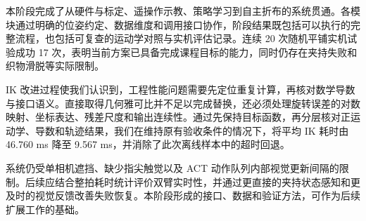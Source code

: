 \documentclass[UTF8,a4paper,zihao=-4]{ctexart}
\begin{document}
本阶段完成了从硬件与标定、遥操作示教、策略学习到自主折布的系统贯通。各模块通过明确的位姿约定、数据维度和调用接口协作，阶段结果既包括可以执行的完整流程，也包括可复查的运动学对照与实机评估记录。连续 20 次随机平铺实机试验成功 17 次，表明当前方案已具备完成课程目标的能力，同时仍存在夹持失败和织物滑脱等实际限制。

IK 改进过程使我们认识到，工程性能问题需要先定位重复计算，再核对数学导数与接口语义。直接取得几何雅可比并不足以完成替换，还必须处理旋转误差的对数映射、坐标表达、残差尺度和输出连续性。通过先保持目标函数，再分层核对正运动学、导数和轨迹结果，我们在维持原有验收条件的情况下，将平均 IK 耗时由 46.760 ms 降至 9.567 ms，并消除了此次离线样本中的超时回退。

系统仍受单相机遮挡、缺少指尖触觉以及 ACT 动作队列内部视觉更新间隔的限制。后续应结合整拍耗时统计评价双臂实时性，并通过更直接的夹持状态感知和更及时的视觉反馈改善失败恢复。本阶段形成的接口、数据和验证方法，可作为后续扩展工作的基础。
\end{document}
